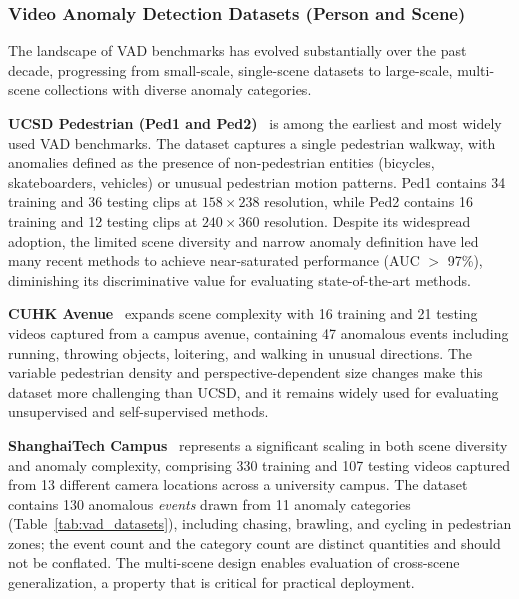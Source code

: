 \documentclass[10pt,a4paper]{article}
\begin{document}
\subsubsection{Video Anomaly Detection Datasets (Person and Scene)}
\label{subsubsec:vad_datasets}

The landscape of VAD benchmarks has evolved substantially over the past decade, progressing from small-scale, single-scene datasets to large-scale, multi-scene collections with diverse anomaly categories.

\textbf{UCSD Pedestrian (Ped1 and Ped2)}~\citep{mahadevan2010anomaly} is among the earliest and most widely used VAD benchmarks. The dataset captures a single pedestrian walkway, with anomalies defined as the presence of non-pedestrian entities (bicycles, skateboarders, vehicles) or unusual pedestrian motion patterns. Ped1 contains 34 training and 36 testing clips at $158 \times 238$ resolution, while Ped2 contains 16 training and 12 testing clips at $240 \times 360$ resolution. Despite its widespread adoption, the limited scene diversity and narrow anomaly definition have led many recent methods to achieve near-saturated performance (AUC $>$ 97\%), diminishing its discriminative value for evaluating state-of-the-art methods.

\textbf{CUHK Avenue}~\citep{lu2013abnormal} expands scene complexity with 16 training and 21 testing videos captured from a campus avenue, containing 47 anomalous events including running, throwing objects, loitering, and walking in unusual directions. The variable pedestrian density and perspective-dependent size changes make this dataset more challenging than UCSD, and it remains widely used for evaluating unsupervised and self-supervised methods.

\textbf{ShanghaiTech Campus}~\citep{luo2017revisit} represents a significant scaling in both scene diversity and anomaly complexity, comprising 330 training and 107 testing videos captured from 13 different camera locations across a university campus. The dataset contains 130 anomalous \emph{events} drawn from 11 anomaly categories (Table~\ref{tab:vad_datasets}), including chasing, brawling, and cycling in pedestrian zones; the event count and the category count are distinct quantities and should not be conflated. The multi-scene design enables evaluation of cross-scene generalization, a property that is critical for practical deployment.
\end{document}

